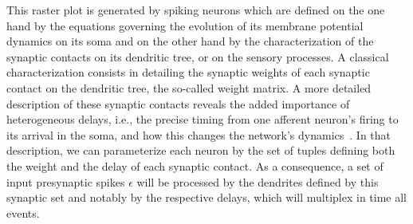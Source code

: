 \documentclass[runningheads]{llncs}
\newcommand{\event}{\epsilon} %
\begin{document}
This raster plot is generated by spiking neurons which are defined on the one hand by the equations governing the evolution of its membrane potential dynamics on its soma and on the other hand by the characterization of the synaptic contacts on its dendritic tree, or on the sensory processes. A classical characterization consists in detailing the synaptic weights of each synaptic contact on the dendritic tree, the so-called weight matrix. A more detailed description of these synaptic contacts reveals the added importance of heterogeneous delays, i.e., the precise timing from one afferent neuron's firing to its arrival in the soma, and how this changes the network's dynamics~\cite{izhikevich_polychronization_2006}. In that description, we can parameterize each neuron by the set of tuples defining both the weight and the delay of each synaptic contact. As a consequence, a set of input presynaptic spikes $\event$ will be processed by the dendrites defined by this synaptic set and notably by the respective delays, which will multiplex in time all events. 
\end{document}
